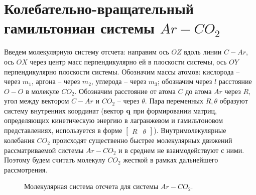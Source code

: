 \section{Колебательно-вращательный гамильтониан системы $Ar-CO_2$}

Введем молекулярную систему отсчета: направим ось $OZ$ вдоль линии $C-Ar$, ось $OX$ через центр масс перпендикулярно ей в плоскости системы, ось $OY$ перпендикулярно плоскости системы. Обозначим массы атомов: кислорода -- через $m_1$, аргона -- через $m_2$, углерода -- через $m_3$; обозначим через $l$ расстояние $O-O$ в молекуле $CO_2$. Обозначим расстояние от атома $C$ до атома $Ar$ через $R$, угол между вектором $C-Ar$ и $CO_2$ -- через $\theta$. Пара переменных $R, \theta$ образуют систему внутренних координат (вектор $\mathbf{q}$ при формировании матриц, определяющих кинетическую энергию в лагранжевом и гамильтоновом представлениях, используется в форме $\begin{bmatrix} R & \theta \end{bmatrix}$). Внутримолекулярные колебания $CO_2$ происходят существенно быстрее молекулярных движений рассматриваемой системы $Ar-CO_2$ и в среднем не взаимодействуют с ними. Поэтому будем считать молекулу $CO_2$ жесткой в рамках дальнейшего рассмотрения.  

\begin{figure}[h]
\centering
{}
\caption{Молекулярная система отсчета для системы $Ar-CO_2$.}
\end{figure}


